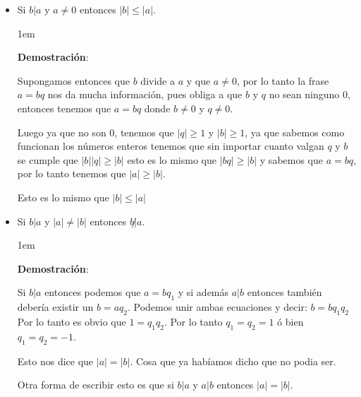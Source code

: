 \documentclass[12pt, fleqn]{report}                             %
\newenvironment{SmallIndentation}[1][0.75em]                    %
    {\begin{adjustwidth}{#1}{}\begin{footnotesize}}                 %
    {\end{footnotesize}\end{adjustwidth}}                           %
\begin{document}
\begin{itemize}
                \clearpage

                \item Si $b|a$ y $a \neq 0$ entonces $|b| \leq |a|$.

                    \begin{SmallIndentation}[1em]
                        \textbf{Demostración}:

                        Supongamos entonces que $b$ divide a $a$ y que $a \neq 0$, por lo tanto
                        la frase $a = bq$ nos da mucha información, pues obliga a que $b$ y $q$
                        no sean ninguno $0$, entonces tenemos que $a = bq$ donde $b \neq 0$ y 
                        $q \neq 0$.

                        Luego ya que no son 0, tenemos que $|q| \geq 1$ y $|b| \geq 1$, ya que sabemos
                        como funcionan los números enteros tenemos que sin importar cuanto valgan $q$ y $b$
                        se cumple que $|b||q| \geq |b|$ esto es lo mismo que $|bq| \geq |b|$ y sabemos que
                        $a = bq$, por lo tanto tenemos que $|a| \geq |b|$.

                        Esto es lo mismo que $|b| \leq |a|$

                    \end{SmallIndentation}


                \item Si $b|a$ y $|a| \neq |b|$ entonces $b\not|a$.

                    \begin{SmallIndentation}[1em]
                        \textbf{Demostración}:

                        Si $b|a$ entonces podemos que $a=bq_1$ y si además $a|b$ entonces también
                        debería existir un $b=aq_2$. Podemos unir ambas ecuaciones y decir: $b=bq_1q_2$
                        Por lo tanto es obvio que $1=q_1q_2$. Por lo tanto $q_1 = q_2 = 1$
                        ó bien $q_1 = q_2 = -1$.

                        Esto nos dice que $|a|=|b|$. Cosa que ya habíamos dicho que no podia ser.

                        Otra forma de escribir esto es que si $b|a$ y $a|b$ entonces $|a| = |b|$.

                    \end{SmallIndentation}

            \end{itemize}
\end{document}
